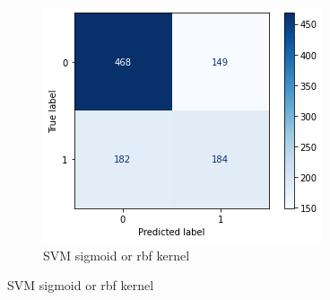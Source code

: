 \documentclass{article}
\begin{document}
\begin{figure}[!h]
\begin{subfigure}[b]{0.25\textwidth}
		\label{fig:three sin x}
	\end{subfigure}
	\hfill
	\begin{subfigure}[b]{0.25\textwidth}
		\centering
		\includegraphics[width=\textwidth]{../images/cmatrix-svm-sigmoid-rbf}
		\caption*{SVM sigmoid or rbf kernel}
		\label{fig:five over x}
	\end{subfigure}
	\label{fig:three graphs}
\end{figure}
\clearpage
\end{document}

